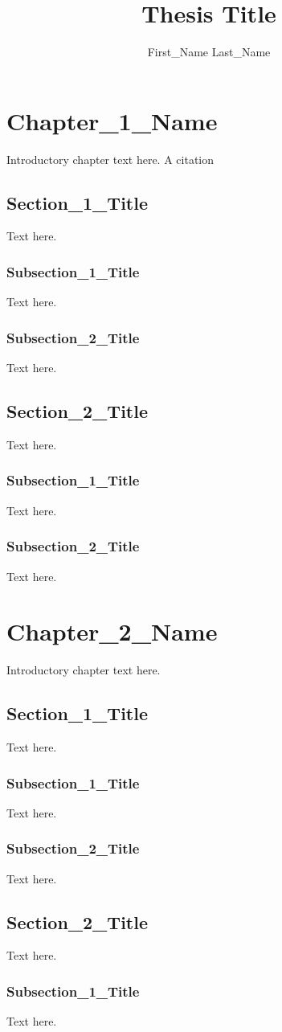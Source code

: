 \documentclass[review,los,12pt]{ryethesis}
\author{First\_Name Last\_Name}
\title{Thesis Title}
\begin{document}
\chapter{Chapter\_1\_Name}

Introductory chapter text here.
A citation~\cite{sample}
\section{Section\_1\_Title}
Text here.
\subsection{Subsection\_1\_Title}
Text here.
\subsection{Subsection\_2\_Title}
Text here.
\section{Section\_2\_Title}
Text here.
\subsection{Subsection\_1\_Title}
Text here.
\subsection{Subsection\_2\_Title}
Text here.
\chapter{Chapter\_2\_Name}
Introductory chapter text here.
\section{Section\_1\_Title}
Text here.
\subsection{Subsection\_1\_Title}
Text here.
\subsection{Subsection\_2\_Title}
Text here.
\section{Section\_2\_Title}
Text here.
\subsection{Subsection\_1\_Title}
Text here.
\end{document}
